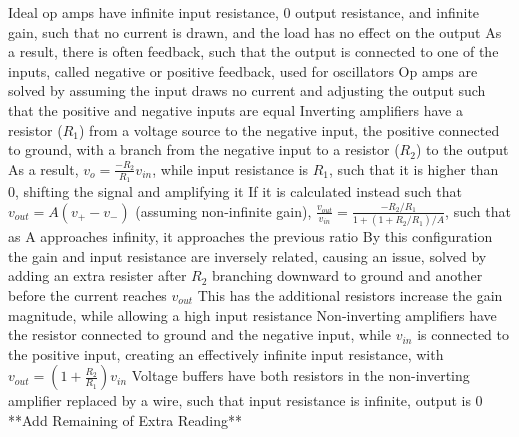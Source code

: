 \documentclass[11 pt, twoside]{article}
\newenvironment{outline*}
{
	\begin{outline}[enumerate]
	}
	{\end{outline}
}
\begin{document}
\begin{outline*}
	\2 Ideal op amps have infinite input resistance, 0 output resistance, and infinite gain, such that no current is drawn, and the load has no effect on the output
		\3 As a result, there is often feedback, such that the output is connected to one of the inputs, called negative or positive feedback, used for oscillators
		\3 Op amps are solved by assuming the input draws no current and adjusting the output such that the positive and negative inputs are equal
	\2 Inverting amplifiers have a resistor ($R_1$) from a voltage source to the negative input, the positive connected to ground, with a branch from the negative input to a resistor ($R_2$) to the output
		\3 As a result, $v_o = \frac{-R_2}{R_1}v_{in}$, while input resistance is $R_1$, such that it is higher than 0, shifting the signal and amplifying it
		\3 If it is calculated instead such that $v_{out} = A(v_+ - v_-)$ (assuming non-infinite gain), $\frac{v_{out}}{v_{in}} = \frac{-R_2/R_1}{1 + (1 + R_2/R_1)/A}$, such that as A approaches infinity, it approaches the previous ratio
		\3 By this configuration the gain and input resistance are inversely related, causing an issue, solved by adding an extra resister after $R_2$ branching downward to ground and another before the current reaches $v_{out}$
			\4 This has the additional resistors increase the gain magnitude, while allowing a high input resistance
	\2 Non-inverting amplifiers have the resistor connected to ground and the negative input, while $v_{in}$ is connected to the positive input, creating an effectively infinite input resistance, with $v_{out} = (1 + \frac{R_2}{R_1})v_{in}$
	\2 Voltage buffers have both resistors in the non-inverting amplifier replaced by a wire, such that input resistance is infinite, output is 0
	\2 **Add Remaining of Extra Reading**
\end{outline*}
\end{document}
